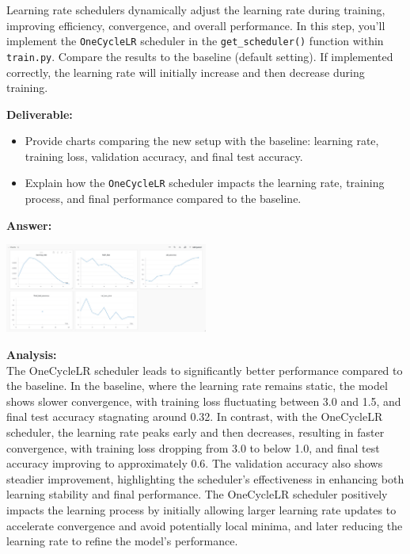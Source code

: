 \documentclass[11pt, oneside]{article}   	%
\begin{document}
Learning rate schedulers dynamically adjust the learning rate during training, improving efficiency, convergence, and overall performance. In this step, you'll implement the \texttt{OneCycleLR} scheduler in the \texttt{get\_scheduler()} function within \texttt{train.py}. Compare the results to the baseline (default setting). If implemented correctly, the learning rate will initially increase and then decrease during training.

\noindent\textbf{Deliverable:}
\begin{itemize}
    \item Provide charts comparing the new setup with the baseline: learning rate, training loss, validation accuracy, and final test accuracy.
    \item Explain how the \texttt{OneCycleLR} scheduler impacts the learning rate, training process, and final performance compared to the baseline.
\end{itemize}

\textbf{Answer:} \\
\begin{center}
    \includegraphics[width=0.5\textwidth]{report_pic/SchedulerChart.png}
\end{center}

\textbf{Analysis: }
\\
The OneCycleLR scheduler leads to significantly better performance compared to the baseline. In the baseline, where the learning rate remains static, the model shows slower convergence, with training loss fluctuating between 3.0 and 1.5, and final test accuracy stagnating around 0.32. In contrast, with the OneCycleLR scheduler, the learning rate peaks early and then decreases, resulting in faster convergence, with training loss dropping from 3.0 to below 1.0, and final test accuracy improving to approximately 0.6. The validation accuracy also shows steadier improvement, highlighting the scheduler's effectiveness in enhancing both learning stability and final performance. The OneCycleLR scheduler positively impacts the learning process by initially allowing larger learning rate updates to accelerate convergence and avoid potentially local minima, and later reducing the learning rate to refine the model’s performance.
\end{document}
